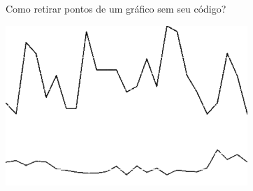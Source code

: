 \documentclass[
  ignorenonframetext,
]{beamer}
\newenvironment{Shaded}{\begin{snugshade}}{\end{snugshade}}
\newcommand{\DataTypeTok}[1]{\textcolor[rgb]{0.13,0.29,0.53}{#1}}
\newcommand{\KeywordTok}[1]{\textcolor[rgb]{0.13,0.29,0.53}{\textbf{#1}}}
\newcommand{\NormalTok}[1]{#1}
\newcommand{\OperatorTok}[1]{\textcolor[rgb]{0.81,0.36,0.00}{\textbf{#1}}}
\newcommand{\StringTok}[1]{\textcolor[rgb]{0.31,0.60,0.02}{#1}}
\begin{document}
\begin{frame}[fragile]{Como retirar pontos de um gráfico sem seu
código?}
\protect\hypertarget{como-retirar-pontos-de-um-gruxe1fico-sem-seu-cuxf3digo-3}{}

\small

\begin{Shaded}
\end{Shaded}

\includegraphics[width=3.6in]{IMAGENS/grafico_ponto2}

\begin{center}
\tiny{}
\end{center}

\end{frame}
\end{document}
